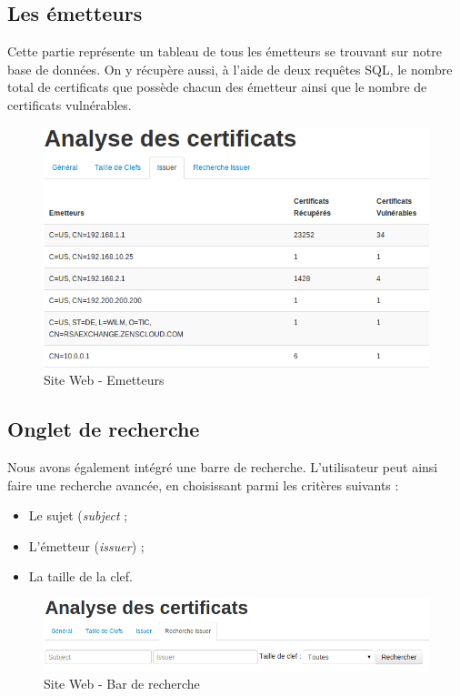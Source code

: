 \subsection{Les émetteurs}

Cette partie représente un tableau de tous les émetteurs se trouvant sur notre base de données. On y récupère aussi, à l'aide de deux requêtes SQL, le nombre total de certificats que possède chacun des émetteur ainsi que le nombre de certificats vulnérables.

\begin{figure}[H]
\begin{center}
\includegraphics[scale=0.5]{images/site_web_issuer.png}
\end{center}
\caption{Site Web - Emetteurs}
\label{issuer}
\end{figure}

\subsection{Onglet de recherche}

Nous avons également intégré une barre de recherche. L'utilisateur peut ainsi faire une recherche avancée, en choisissant parmi les critères suivants :
\begin{itemize}
\item Le sujet (\textit{subject} ;
\item L'émetteur (\textit{issuer}) ;
\item La taille de la clef.\\
\end{itemize}

\begin{figure}[H]
\begin{center}
\includegraphics[scale=0.5]{images/site_web_search_bar.png}
\end{center}
\caption{Site Web - Bar de recherche}
\label{search_bar}
\end{figure}

